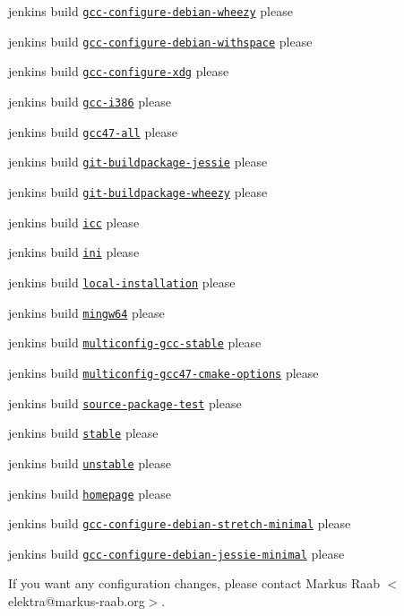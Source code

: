 \begin{DoxyItemize}
\item jenkins build \href{https://build.libelektra.org/job/elektra-gcc-configure-debian-wheezy/}{\tt gcc-\/configure-\/debian-\/wheezy} please
\item jenkins build \href{https://build.libelektra.org/job/elektra-gcc-configure-debian-withspace/}{\tt gcc-\/configure-\/debian-\/withspace} please
\item jenkins build \href{https://build.libelektra.org/job/elektra-gcc-configure-xdg/}{\tt gcc-\/configure-\/xdg} please
\item jenkins build \href{https://build.libelektra.org/job/elektra-gcc-i386/}{\tt gcc-\/i386} please
\item jenkins build \href{https://build.libelektra.org/job/elektra-gcc47-all/}{\tt gcc47-\/all} please
\item jenkins build \href{https://build.libelektra.org/job/elektra-git-buildpackage-jessie/}{\tt git-\/buildpackage-\/jessie} please
\item jenkins build \href{https://build.libelektra.org/job/elektra-git-buildpackage-wheezy/}{\tt git-\/buildpackage-\/wheezy} please
\item jenkins build \href{https://build.libelektra.org/job/elektra-icc/}{\tt icc} please
\item jenkins build \href{https://build.libelektra.org/job/elektra-ini-mergerequests/}{\tt ini} please
\item jenkins build \href{https://build.libelektra.org/job/elektra-local-installation/}{\tt local-\/installation} please
\item jenkins build \href{https://build.libelektra.org/job/elektra-gcc-configure-mingw-w64/}{\tt mingw64} please
\item jenkins build \href{https://build.libelektra.org/job/elektra-multiconfig-gcc-stable/}{\tt multiconfig-\/gcc-\/stable} please
\item jenkins build \href{https://build.libelektra.org/job/elektra-multiconfig-gcc47-cmake-options/}{\tt multiconfig-\/gcc47-\/cmake-\/options} please
\item jenkins build \href{https://build.libelektra.org/job/elektra-source-package-test/}{\tt source-\/package-\/test} please
\item jenkins build \href{https://build.libelektra.org/job/elektra-mergerequests-stable/}{\tt stable} please
\item jenkins build \href{https://build.libelektra.org/job/elektra-mergerequests-unstable/}{\tt unstable} please
\item jenkins build \href{https://build.libelektra.org/job/elektra-homepage/}{\tt homepage} please
\item jenkins build \href{https://build.libelektra.org/job/elektra-gcc-configure-debian-stretch-minimal/}{\tt gcc-\/configure-\/debian-\/stretch-\/minimal} please
\item jenkins build \href{https://build.libelektra.org/job/elektra-gcc-configure-debian-jessie-minimal/}{\tt gcc-\/configure-\/debian-\/jessie-\/minimal} please
\end{DoxyItemize}

If you want any configuration changes, please contact {\ttfamily Markus Raab $<$elektra@markus-\/raab.\+org$>$}. 